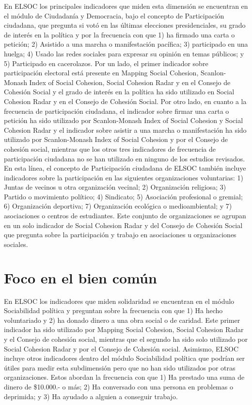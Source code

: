 \documentclass[
  12pt,
]{book}
\begin{document}
En ELSOC los principales indicadores que miden esta dimensión se encuentran en el módulo de Ciudadanía y Democracia, bajo el concepto de Participación ciudadana, que pregunta si votó en las últimas elecciones presidenciales, su grado de interés en la política y por la frecuencia con que 1) ha firmado una carta o petición; 2) Asistido a una marcha o manifestación pacífica; 3) participado en una huelga; 4) Usado las redes sociales para expresar su opinión en temas públicos; y 5) Participado en cacerolazos. Por un lado, el primer indicador sobre participación electoral está presente en Mapping Social Cohesion, Scanlon-Monash Index of Social Cohesion, Social Cohesion Radar y en el Consejo de Cohesión Social y el grado de interés en la política ha sido utilizado en Social Cohesion Radar y en el Consejo de Cohesión Social. Por otro lado, en cuanto a la frecuencia de participación ciudadana, el indicador sobre firmar una carta o petición ha sido utilizado por Scanlon-Monash Index of Social Cohesion y Social Cohesion Radar y el indicador sobre asistir a una marcha o manifestación ha sido utilizado por Scanlon-Monash Index of Social Cohesion y por el Consejo de cohesión social, mientras que los otros tres indicadores de frecuencia de participación ciudadana no se han utilizado en ninguno de los estudios revisados. En esta línea, el concepto de Participación ciudadana de ELSOC también incluye indicadores sobre la participación en las siguientes organizaciones voluntarias: 1) Juntas de vecinos u otra organización vecinal; 2) Organización religiosa; 3) Partido o movimiento político; 4) Sindicato; 5) Asociación profesional o gremial; 6) Organización deportiva; 7) Organización ecológica o medioambiental; y 7) asociaciones o centros de estudiantes. Este conjunto de organizaciones se agrupan en un solo indicador de Social Cohesion Radar y del Consejo de Cohesión Social que pregunta sobre la participación y trabajo en asociaciones u organizaciones sociales.

\hypertarget{foco-en-el-bien-comuxfan-1}{%
\section{Foco en el bien común}\label{foco-en-el-bien-comuxfan-1}}

En ELSOC los indicadores que miden solidaridad se encuentran en el módulo Sociabilidad política y preguntan sobre la frecuencia con que 1) Ha hecho voluntariado y 2) ha donado dinero a una obra social o de caridad. Este primer indicador ha sido utilizado por Mapping Social Cohesion, Social Cohesion Radar y el Consejo de cohesión social, mientras que el segundo ha sido solo utilizado por Social Cohesion Radar y por el Consejo de Cohesión social. Asimismo, ELSOC incluye otros indicadores dentro del módulo Sociabilidad política que podrían ser útiles para medir esta subdimensión pero que no han sido utilizados por otras organizaciones. Estos abordan la frecuencia con que 1) Ha prestado una suma de dinero de \$10.000.- o más; 2) Ha conversado con una persona en problemas o deprimida; y 3) Ha ayudado a alguien a conseguir trabajo.
\end{document}
